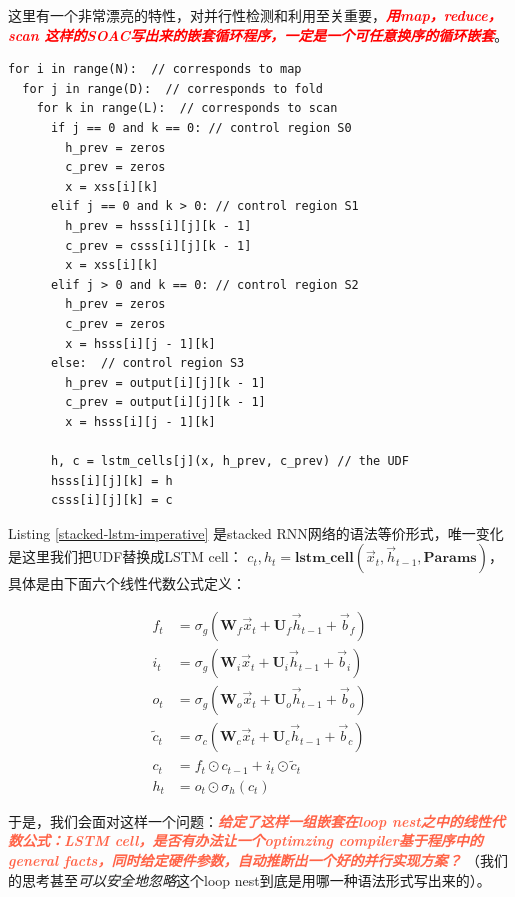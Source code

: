 这里有一个非常漂亮的特性，对并行性检测和利用至关重要，\textit{\textbf{\textcolor{red}{用map，reduce，scan 这样的SOAC写出来的嵌套循环程序，一定是一个可任意换序的循环嵌套}}}。

\newpage
\begin{lstlisting}[language=cplus, caption={Stacked RNN的imperative style语法等价形，这里把UDF替换成LSTM的cell function}, label={stacked-lstm-imperative}]
for i in range(N):  // corresponds to map
  for j in range(D):  // corresponds to fold
    for k in range(L):  // corresponds to scan
      if j == 0 and k == 0: // control region S0
        h_prev = zeros
        c_prev = zeros
        x = xss[i][k]
      elif j == 0 and k > 0: // control region S1
        h_prev = hsss[i][j][k - 1]
        c_prev = csss[i][j][k - 1]
        x = xss[i][k]
      elif j > 0 and k == 0: // control region S2
        h_prev = zeros
        c_prev = zeros
        x = hsss[i][j - 1][k]
      else:  // control region S3
        h_prev = output[i][j][k - 1]
        c_prev = output[i][j][k - 1]
        x = hsss[i][j - 1][k]
  
      h, c = lstm_cells[j](x, h_prev, c_prev) // the UDF
      hsss[i][j][k] = h
      csss[i][j][k] = c
\end{lstlisting}

Listing \ref{stacked-lstm-imperative} 是stacked RNN网络的语法等价形式，唯一变化是这里我们把UDF替换成LSTM cell：
$c_t, h_t = \textbf{lstm\_cell}\left(\vec{x}_t,\vec{h}_{t-1}, \mathbf{Params} \right)$，具体是由下面六个线性代数公式定义：

\begin{align}
     f_t &= \sigma_g\left(\mathbf{W}_f\vec{x}_t + \mathbf{U}_f \vec{h}_{t-1}+\vec{b}_f\right) \\
     i_t &= \sigma_g\left(\mathbf{W}_i\vec{x}_t + \mathbf{U}_i \vec{h}_{t-1}+\vec{b}_i\right) \\
     o_t &= \sigma_g\left(\mathbf{W}_o\vec{x}_t + \mathbf{U}_o \vec{h}_{t-1}+\vec{b}_o\right) \\
     \widetilde{c}_t &= \sigma_c\left(\mathbf{W}_c\vec{x}_t + \mathbf{U}_c \vec{h}_{t-1}+\vec{b}_c\right) \\
     c_t &= f_t \odot c_{t-1} + i_t \odot \widetilde{c}_t \\
     h_t & = o_t \odot \sigma_h\left(c_t\right)
\end{align}

于是，我们会面对这样一个问题：\textit{\textbf{\textcolor{tomato}{给定了这样一组嵌套在loop nest之中的线性代数公式：LSTM cell，是否有办法让一个optimzing compiler基于程序中的general facts，同时给定硬件参数，自动推断出一个好的并行实现方案？}}} （我们的思考甚至\textit{可以安全地忽略}这个loop nest到底是用哪一种语法形式写出来的）。

